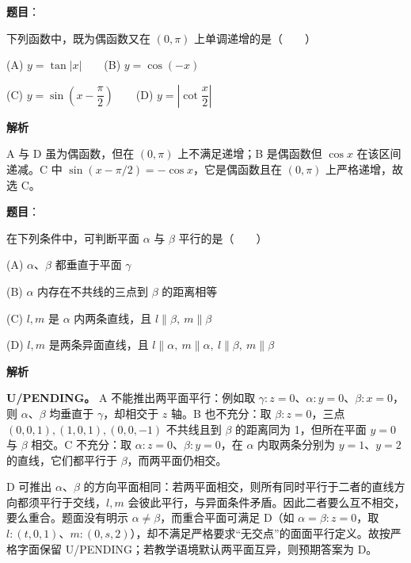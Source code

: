 \begin{answer}

\textbf{题目}：

下列函数中，既为偶函数又在 \((0,\pi)\) 上单调递增的是\mbox{（　　）}

    (A) \(y=\tan|x|\)　　(B) \(y=\cos(-x)\)

    (C) \(y=\sin\left(x-\dfrac{\pi}{2}\right)\)　　(D) \(y=\left|\cot\dfrac{x}{2}\right|\)

\textbf{解析}

A 与 D 虽为偶函数，但在 \((0,\pi)\) 上不满足递增；B 是偶函数但 \(\cos x\) 在该区间递减。C 中
\(\sin(x-\pi/2)=-\cos x\)，它是偶函数且在 \((0,\pi)\) 上严格递增，故选 C。


\end{answer}
\begin{answer}

\textbf{题目}：

在下列条件中，可判断平面 \(\alpha\) 与 \(\beta\) 平行的是\mbox{（　　）}

    (A) \(\alpha\text{、}\beta\) 都垂直于平面 \(\gamma\)

    (B) \(\alpha\) 内存在不共线的三点到 \(\beta\) 的距离相等

    (C) \(l,m\) 是 \(\alpha\) 内两条直线，且 \(l\parallel\beta,\ m\parallel\beta\)

    (D) \(l,m\) 是两条异面直线，且 \(l\parallel\alpha,\ m\parallel\alpha,\ l\parallel\beta,\ m\parallel\beta\)

\textbf{解析}

\textbf{U/PENDING。} A 不能推出两平面平行：例如取 \(\gamma:z=0\)、\(\alpha:y=0\)、\(\beta:x=0\)，则 \(\alpha\)、\(\beta\) 均垂直于 \(\gamma\)，却相交于 \(z\) 轴。B 也不充分：取 \(\beta:z=0\)，三点 \((0,0,1),(1,0,1),(0,0,-1)\) 不共线且到 \(\beta\) 的距离同为 1，但所在平面 \(y=0\) 与 \(\beta\) 相交。C 不充分：取 \(\alpha:z=0\)、\(\beta:y=0\)，在 \(\alpha\) 内取两条分别为 \(y=1\)、\(y=2\) 的直线，它们都平行于 \(\beta\)，而两平面仍相交。

D 可推出 \(\alpha\)、\(\beta\) 的方向平面相同：若两平面相交，则所有同时平行于二者的直线方向都须平行于交线，\(l,m\) 会彼此平行，与异面条件矛盾。因此二者要么互不相交，要么重合。题面没有明示 \(\alpha\ne\beta\)，而重合平面可满足 D（如 \(\alpha=\beta:z=0\)，取 \(l:(t,0,1)\)、\(m:(0,s,2)\)），却不满足严格要求“无交点”的面面平行定义。故按严格字面保留 U/PENDING；若教学语境默认两平面互异，则预期答案为 D。


\end{answer}
